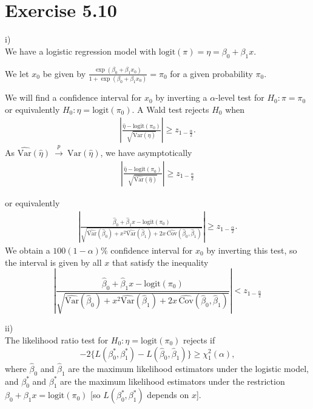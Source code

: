 \documentclass[a4paper]{article}
\newcommand{\Var}{\mathrm{Var}}
\newcommand{\Cov}{\mathrm{Cov}}
\begin{document}
\vspace{\baselineskip}
\section{Exercise 5.10}

i)\\
We have a logistic regression model with $\mathrm{logit}(\pi)=\eta=\beta_0+\beta_1 x$.

We let $x_0$ be given by $\frac{\exp(\beta_{0}+\beta_{1} x_{0})}{1+\exp(\beta_{0}+\beta_{1} x_{0})} = \pi_{0}$ for a given probability $\pi_{0}$.

We will  find a confidence interval for $x_{0}$ by inverting a $\alpha$-level test for $H_{0}: \pi=\pi_{0}$ or equivalently $H_{0}: \eta = \mathrm{logit}(\pi_{0})$.
A Wald test  rejects  $H_0$ when
%
\begin{align*}
\left| \frac{\widehat{\eta} -\mathrm{logit}(\pi_{0})}{\sqrt{\Var(\widehat{\eta})}}\right| \ge z_{1-\frac{\alpha}{2}}.
\end{align*}
As $\widehat{\Var}(\widehat{\eta}) ~\overset{p}{\to}~ \Var(\widehat{\eta})$, we have asymptotically
\begin{align*}
\left| \frac{\widehat{\eta} -\mathrm{logit}(\pi_{0})}{\sqrt{\widehat{\Var}(\widehat{\eta})}}\right| \ge z_{1-\frac{\alpha}{2}}
\end{align*}


or equivalently
\begin{align*}
\left| \frac{\widehat{\beta}_0+\widehat{\beta}_1 x-\mathrm{logit}(\pi_0)}{\sqrt{\widehat{\Var}(\widehat{\beta}_0)+x^2 \widehat{\Var}(\widehat{\beta}_1)+
2x\,\widehat{\Cov}(\widehat{\beta}_0,\widehat{\beta}_1)}}\right| \ge z_{1-\frac{\alpha}{2}}.
\end{align*}
%
We obtain a $100(1-\alpha){\%}$ confidence interval for $x_{0}$ by inverting this test, so the interval is given by all $x$ that satisfy the inequality
%
\[
\left| \frac{\widehat{\beta}_0+\widehat{\beta}_1 x-\mathrm{logit}(\pi_0)}{\sqrt{\widehat{\Var}(\widehat{\beta}_0)+x^2\widehat{\Var}(\widehat{\beta}_1)+
2x\, \widehat{\Cov}(\widehat{\beta}_0,\widehat{\beta}_1)}}\right| < z_{1-\frac{\alpha}{2}}
\]


ii)\\
The likelihood ratio  test  for $H_0: \eta=\mathrm{logit}(\pi_0)$ rejects if
\[
-2\{L(\beta_0^*,\beta_1^*) - L(\widehat{\beta}_0,\widehat{\beta}_1)\} \ge \chi_{1}^{2}(\alpha),
\]
where $\widehat{\beta}_0$ and $\widehat{\beta}_1$ are the maximum likelihood estimators under the logistic model, and $\beta_0^*$ and $\beta_1^*$ are the maximum likelihood estimators under the restriction $\beta_0+\beta_1 x =\mathrm{logit}(\pi_0)$ [so $L(\beta_0^*,\beta_1^*)$ depends on $x$].
\end{document}
